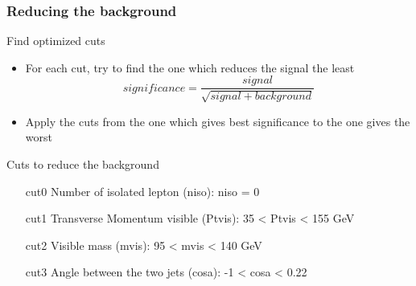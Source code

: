\documentclass{beamer}
\begin{document}
\begin{frame}
    \frametitle{Reducing the background}

    \begin{block}{Find optimized cuts}
        \begin{itemize}
            \item For each cut, try to find the one which reduces the signal the least
                \[significance = \frac{signal}{\sqrt{signal + background}}\]
            \item Apply the cuts from the one which gives best significance to the one gives the worst
        \end{itemize}
    \end{block}

    \begin{exampleblock}{Cuts to reduce the background}
        \begin{enumerate}
            \item [cut0] Number of isolated lepton (niso): niso = 0 %
            \item [cut1] Transverse Momentum visible (Ptvis): 35 < Ptvis < 155 GeV
            \item [cut2] Visible mass (mvis): 95 < mvis < 140 GeV
            \item [cut3] Angle between the two jets (cosa): -1 < cosa < 0.22
        \end{enumerate}
    \end{exampleblock}

\end{frame}
\end{document}
